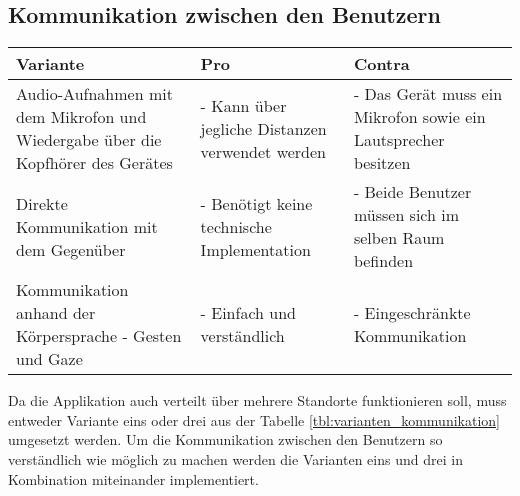 \subsection{Kommunikation zwischen den Benutzern}
\begin{center}
	\begin{tabularx} {\textwidth} { |X|X|X| }
		\hline
		\rowcolor{black}
		\color{white} \textbf{Variante} & \color{white} \textbf{Pro} & 
		\color{white} \textbf{Contra} \\
		\hline
		Audio-Aufnahmen mit dem Mikrofon und Wiedergabe über die Kopfhörer des Gerätes & - Kann über jegliche Distanzen verwendet werden & - Das Gerät muss ein Mikrofon sowie ein Lautsprecher besitzen \\
		\hline
		Direkte Kommunikation mit dem Gegenüber & - Benötigt keine technische Implementation & - Beide Benutzer müssen sich im selben Raum befinden \\
		\hline
		Kommunikation anhand der Körpersprache - Gesten und Gaze & - Einfach und verständlich & - Eingeschränkte Kommunikation \\
		\hline	
	\end{tabularx}
\end{center}
\label{tbl:varianten_kommunikation}

Da die Applikation auch verteilt über mehrere Standorte funktionieren soll, muss entweder Variante eins oder drei aus der Tabelle \ref{tbl:varianten_kommunikation} umgesetzt werden. Um die Kommunikation zwischen den Benutzern so verständlich wie möglich zu machen werden die Varianten eins und drei in Kombination miteinander implementiert.